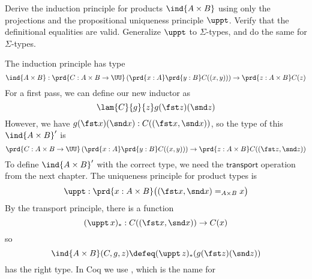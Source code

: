 Derive the induction principle for products $\ind{A \times B}$ using only the
projections and the propositional uniqueness principle $\uppt$.
Verify that the definitional equalities are valid.  Generalize $\uppt$
to $\Sigma$-types, and do the same for $\Sigma$-types. 

 \soln 
The induction principle has type
\[
  \ind{A\times B} : \prd{C: A\times B \to \UU}\left(\prd{x:A}\prd{y:B}C((x,
    y))\right) \to \prd{z:A\times B}C(z)
\]
For a first pass, we can define our new inductor as
\[
  \lam{C}{g}{z}g(\fst z)(\snd z)
\]
However, we have $g(\fst x)(\snd x) : C((\fst x, \snd x))$, so the type of this
$\ind{A \times B}'$ is
\[
  \prd{C: A\times B \to \UU}\left(\prd{x:A}\prd{y:B}C((x,
    y))\right) \to \prd{z:A\times B}C((\fst z, \snd z))
    \]
To define $\ind{A \times B}'$ with the correct type, we need the
$\mathsf{transport}$ operation from the next chapter.  The uniqueness principle
for product types is
\[
  \uppt : \prd{x : A \times B} \big((\fst x, \snd x) =_{A \times B} x\big)
\]
By the transport principle, there is a function
\[
  (\uppt\, x)_{*} : C((\fst x, \snd x)) \to C(x)
\]
so
\[
  \ind{A \times B}(C, g, z)
  \defeq
  (\uppt\, z)_{*}(g(\fst z)(\snd z))
\]
has the right type.  In Coq we use , which is the name for
